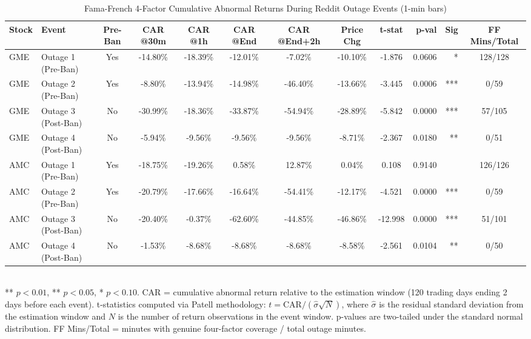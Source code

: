 \begin{table}[htbp]
  \centering
  \caption{Fama-French 4-Factor Cumulative Abnormal Returns During Reddit Outage Events (1-min bars)}
  \label{tab:ff4_car}
  \begin{tabular}{llcccccccrrc}
    \hline\hline
    Stock & Event & Pre-Ban & CAR @30m & CAR @1h & CAR @End & CAR @End+2h & Price Chg & t-stat & p-val & Sig & FF Mins/Total \\
    \hline
    GME & Outage 1 (Pre-Ban) & Yes & -14.80\% & -18.39\% & -12.01\% & -7.02\% & -10.10\% & -1.876 & 0.0606 & * & 128/128 \\
    GME & Outage 2 (Pre-Ban) & Yes & -8.80\% & -13.94\% & -14.98\% & -46.40\% & -13.66\% & -3.445 & 0.0006 & *** & 0/59 \\
    GME & Outage 3 (Post-Ban) & No & -30.99\% & -18.36\% & -33.87\% & -54.94\% & -28.89\% & -5.842 & 0.0000 & *** & 57/105 \\
    GME & Outage 4 (Post-Ban) & No & -5.94\% & -9.56\% & -9.56\% & -9.56\% & -8.71\% & -2.367 & 0.0180 & ** & 0/51 \\
    \hline
    AMC & Outage 1 (Pre-Ban) & Yes & -18.75\% & -19.26\% & 0.58\% & 12.87\% & 0.04\% & 0.108 & 0.9140 &  & 126/126 \\
    AMC & Outage 2 (Pre-Ban) & Yes & -20.79\% & -17.66\% & -16.64\% & -54.41\% & -12.17\% & -4.521 & 0.0000 & *** & 0/59 \\
    AMC & Outage 3 (Post-Ban) & No & -20.40\% & -0.37\% & -62.60\% & -44.85\% & -46.86\% & -12.998 & 0.0000 & *** & 51/101 \\
    AMC & Outage 4 (Post-Ban) & No & -1.53\% & -8.68\% & -8.68\% & -8.68\% & -8.58\% & -2.561 & 0.0104 & ** & 0/50 \\
    \hline\hline
  \end{tabular}
  \\[4pt]
  {\small *** $p<0.01$, ** $p<0.05$, * $p<0.10$. CAR = cumulative abnormal return relative to the estimation window (120 trading days ending 2 days before each event). t-statistics computed via Patell methodology: $t = \text{CAR} / (\hat{\sigma} \sqrt{N})$, where $\hat{\sigma}$ is the residual standard deviation from the estimation window and $N$ is the number of return observations in the event window. p-values are two-tailed under the standard normal distribution. FF Mins/Total = minutes with genuine four-factor coverage / total outage minutes.}
\end{table}
